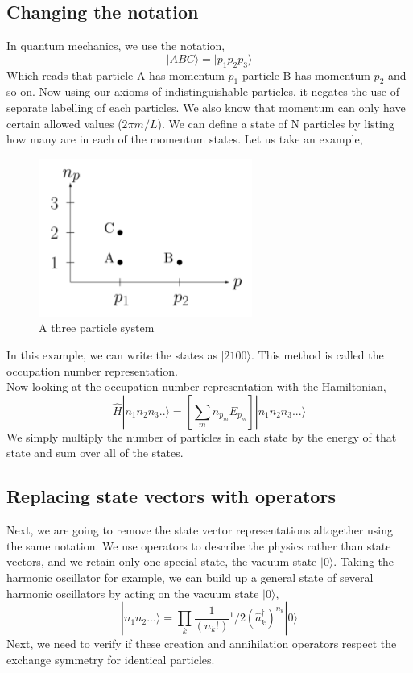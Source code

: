 \subsection{Changing the notation}
In quantum mechanics, we use the notation,
\begin{equation*}
    |ABC\rangle=|p_1p_2p_3\rangle
\end{equation*}
Which reads that particle A has momentum $p_1$ particle B has momentum $p_2$ and so on. Now using our axioms of indistinguishable particles, it negates the use of separate labelling of each particles. We also know that momentum can only have certain allowed values ($2\pi m/L$). We can define a state of N particles by listing how many are in each of the momentum states. Let us take an example,\\
\begin{figure}[H]
    \centering
    \includegraphics[scale=1]{Figures/occupation.png}
    \caption{A three particle system}
    \label{fig:my_label}
\end{figure}

In this example, we can write the states as $|2100\rangle$. This method is called the occupation number representation.\\
Now looking at the occupation number representation with the Hamiltonian,
\begin{equation}
    \hat{H}|n_1n_2n_3..\rangle=\left[\sum_m n_{p_m}E_{p_m}\right]|n_1n_2n_3...\rangle
\end{equation}
We simply multiply the number of particles in each state by the energy of that state and sum over all of the states.
\subsection{Replacing state vectors with operators}
Next, we are going to remove the state vector representations altogether using the same notation. We use operators to describe the physics rather than state vectors, and we retain only one special state, the vacuum state $|0\rangle$. Taking the harmonic oscillator for example, we can build up a general state of several harmonic oscillators by acting on the vacuum state $|0\rangle$,
\begin{equation}
    |n_1n_2...\rangle=\prod_{k}\frac{1}{(n_k!)}{^1/2}(\hat{a}^\dagger_k)^{n_k}|0\rangle
\end{equation}
Next, we need to verify if these creation and annihilation operators respect the exchange symmetry for identical particles.


